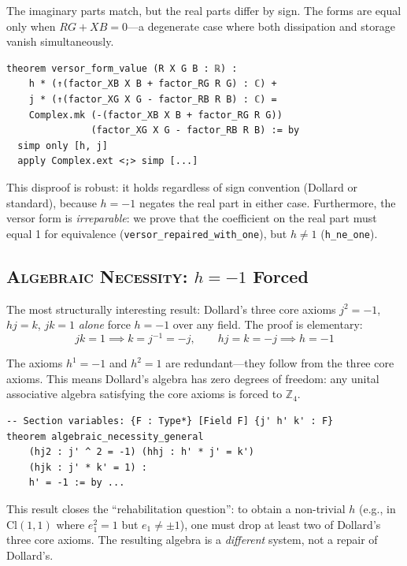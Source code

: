 \documentclass[runningheads]{llncs}
\begin{document}
The imaginary parts match, but the real parts differ by sign. The forms are equal
only when $RG + XB = 0$---a degenerate case where both dissipation and storage
vanish simultaneously.

\begin{lstlisting}[caption={Versor form disproof (excerpt from \texttt{telegraph\_equation.lean})},basicstyle=\ttfamily\footnotesize]
theorem versor_form_value (R X G B : ℝ) :
    h * (↑(factor_XB X B + factor_RG R G) : ℂ) +
    j * (↑(factor_XG X G - factor_RB R B) : ℂ) =
    Complex.mk (-(factor_XB X B + factor_RG R G))
               (factor_XG X G - factor_RB R B) := by
  simp only [h, j]
  apply Complex.ext <;> simp [...]
\end{lstlisting}

This disproof is robust: it holds regardless of sign convention (Dollard or
standard), because $h = -1$ negates the real part in either case. Furthermore,
the versor form is \emph{irreparable}: we prove that the coefficient on the
real part must equal 1 for equivalence (\texttt{versor\_repaired\_with\_one}),
but $h \neq 1$ (\texttt{h\_ne\_one}).

\subsection{\textsc{Algebraic Necessity}: $h = -1$ Forced}
\label{sec:algnec}

The most structurally interesting result: Dollard's three core axioms
$j^2 = -1$, $hj = k$, $jk = 1$ \emph{alone} force $h = -1$ over any field.
The proof is elementary:
\[
  jk = 1 \implies k = j^{-1} = -j, \qquad hj = k = -j \implies h = -1
\]

The axioms $h^1 = -1$ and $h^2 = 1$ are redundant---they follow from the three
core axioms. This means Dollard's algebra has zero degrees of freedom: any
unital associative algebra satisfying the core axioms is forced to
$\mathbb{Z}_4$.

\begin{lstlisting}[caption={Algebraic necessity over any field (excerpt from \texttt{algebraic\_necessity.lean})}]
-- Section variables: {F : Type*} [Field F] {j' h' k' : F}
theorem algebraic_necessity_general
    (hj2 : j' ^ 2 = -1) (hhj : h' * j' = k')
    (hjk : j' * k' = 1) :
    h' = -1 := by ...
\end{lstlisting}

This result closes the ``rehabilitation question'': to obtain a non-trivial $h$
(e.g., in $\mathrm{Cl}(1,1)$ where $e_1^2 = 1$ but $e_1 \neq \pm 1$), one
must drop at least two of Dollard's three core axioms. The resulting algebra
is a \emph{different} system, not a repair of Dollard's.
\end{document}
